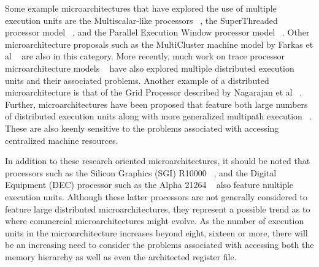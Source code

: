 \documentclass[10pt,dvips]{article}
\begin{document}
Some example microarchitectures that have explored the
use of multiple execution units are the Multiscalar-like
processors ~\cite{Sohi95,sundararaman97multiscalar},
the SuperThreaded processor model ~\cite{tsai96superthread},
and
the Parallel Execution Window processor model ~\cite{kemp96pew}.
Other microarchitecture proposals such as the MultiCluster machine
model by 
Farkas et al ~\cite{farkas97multicluster} are also in this category.
More recently, much work on trace processor microarchitecture 
models ~\cite{rotenberg97trace,vajapeyam97sequences,rotenberg99control}
have also explored multiple distributed execution units and their associated
problems.
Another example of a distributed microarchitecture is that
of the Grid Processor described by Nagarajan et al ~\cite{Nag01}.
Further, microarchitectures have been proposed that feature both
large numbers of distributed execution units along with more
generalized multipath execution ~\cite{uht02realizing,morano02high}.
These are also keenly sensitive to the problems associated with accessing
centralized machine resources.

In addition to these research oriented microarchitectures, it should
be noted that processors such as the 
Silicon Graphics (SGI) R10000 ~\cite{yeager96r10000}, 
and the Digital Equipment (DEC) processor such as the
Alpha 21264 ~\cite{leibholz97alpha,Kessler98}
also feature multiple execution units.
Although these latter processors are not generally considered to
feature large distributed microarchitectures, they represent a 
possible trend as to where commercial microarchitectures might evolve.
As the number of execution units in the microarchitecture increases
beyond eight, sixteen or more, there will be an increasing need
to consider the problems associated with accessing both
the memory hierarchy as well as even the architected register
file.
\end{document}
